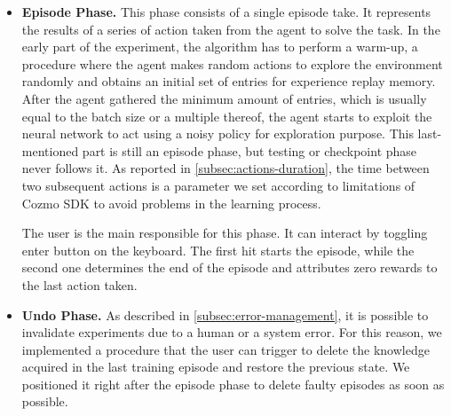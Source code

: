\begin{itemize}
    \item \textbf{Episode Phase.} This phase consists of a single episode take.
          It represents the results of a series of action taken from the agent to solve the task.
          In the early part of the experiment, the algorithm has to perform a warm-up, a procedure where the agent makes random actions to explore the environment randomly and obtains an initial set of entries for experience replay memory.
          After the agent gathered the minimum amount of entries, which is usually equal to the batch size or a multiple thereof, the agent starts to exploit the neural network to act using a noisy policy for exploration purpose.
          This last-mentioned part is still an episode phase, but testing or checkpoint phase never follows it.
          As reported in \vref{subsec:actions-duration}, the time between two subsequent actions is a parameter we set according to limitations of Cozmo SDK to avoid problems in the learning process.

          The user is the main responsible for this phase.
          It can interact by toggling enter button on the keyboard.
          The first hit starts the episode, while the second one determines the end of the episode and attributes zero rewards to the last action taken.

    \item \textbf{Undo Phase.} As described in \vref{subsec:error-management}, it is possible to invalidate experiments due to a human or a system error.
          For this reason, we implemented a procedure that the user can trigger to delete the knowledge acquired in the last training episode and restore the previous state.
          We positioned it right after the episode phase to delete faulty episodes as soon as possible.


\end{itemize}
